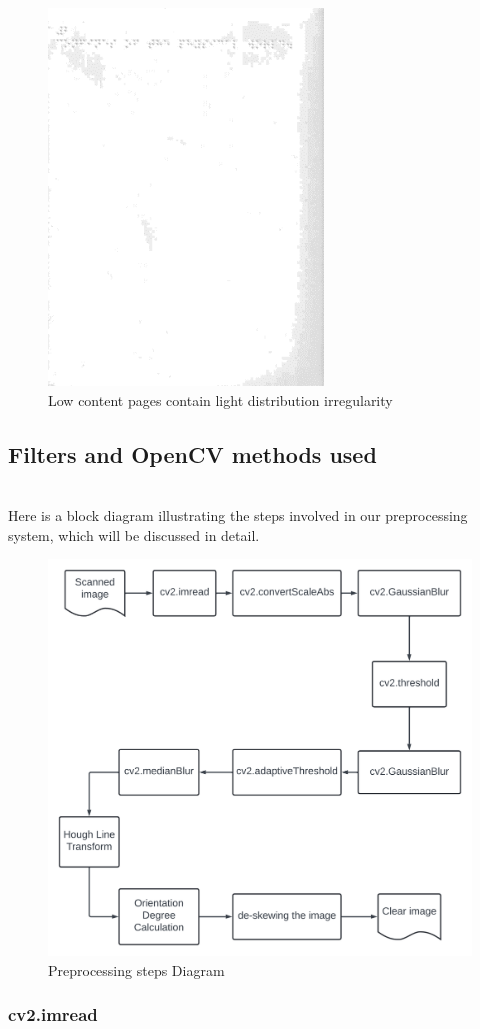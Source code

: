 \begin{figure}[h!]
    \centering
    \includegraphics[width=.9\textwidth,height = 10cm]{Low content.png}
    \caption{Low content pages contain light distribution irregularity}
    \label{fig:Clear real braille samples}
\end{figure}
\clearpage
\hypertarget{filters-and-opencv-methods-used}{%
\subsection{Filters and OpenCV methods
used}\label{filters-and-opencv-methods-used}}
\\
\quad Here is a block diagram illustrating the steps involved in our preprocessing system, which will be discussed in detail.\\
\begin{figure}[h!]
    \centering
    \includegraphics[width=.9\textwidth]{Preprocessing diagram.png}
    \caption{Preprocessing steps Diagram}
    \label{fig:Clear real braille samples}
\end{figure}
\newpage
\hypertarget{cv2.imread}{%
\subsubsection{cv2.imread}\label{cv2.imread}}


